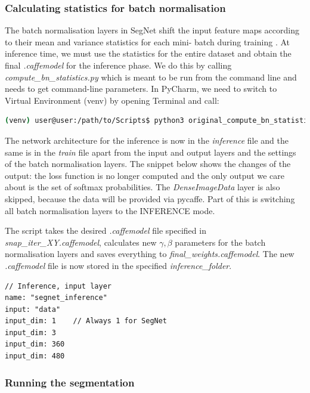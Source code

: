 \subsubsection{Calculating statistics for batch normalisation}
The batch normalisation layers in SegNet shift the input feature maps according to their mean and variance statistics for each mini- batch during training \cite{mehlig}. At inference time, we must use the statistics for the entire dataset and obtain the final \textit{.caffemodel} for the inference phase. \cite{segnet_get_started} We do this by calling \textit{compute\_bn\_statistics.py} which is meant to be run from the command line and needs to get command-line parameters. In PyCharm, we need to switch to Virtual Environment (venv) by opening Terminal and call:

\begin{lstlisting}[language=bash]
(venv) user@user:/path/to/Scripts$ python3 original_compute_bn_statistics.py /path/to/train.prototxt /path/to/snap_iter_XY.caffemodel /path/to/inference_folder
\end{lstlisting}

The network architecture for the inference is now in the \textit{inference} file and the same is in the \textit{train} file apart from the input and output layers and the settings of the batch normalisation layers. The snippet below shows the changes of the output: the loss function is no longer computed and the only output we care about is the set of softmax probabilities. The \textit{DenseImageData} layer is also skipped, because the data will be provided via pycaffe. Part of this is switching all batch normalisation layers to the INFERENCE mode. \cite{issue}

The script takes the desired \textit{.caffemodel} file specified in \textit{snap\_iter\_XY.caffemodel}, calculates new $ \gamma, \beta $ parameters for the batch normalisation layers and saves everything to \textit{final\_weights.caffemodel}. The new \textit{.caffemodel} file is now stored in the specified \textit{inference\_folder}. \cite{issue}

\begin{lstlisting}[caption={Replacing input layer type in \textit{inference.prototxt} \cite{filip_github}},captionpos=b]
// Inference, input layer
name: "segnet_inference"
input: "data"
input_dim: 1	// Always 1 for SegNet
input_dim: 3
input_dim: 360
input_dim: 480
\end{lstlisting}

\subsubsection{Running the segmentation}

